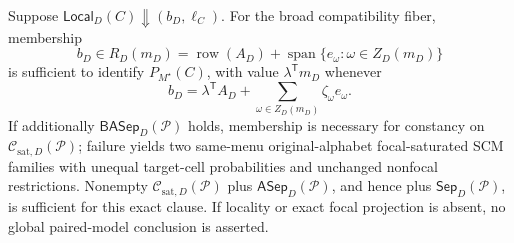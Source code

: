 Suppose \(\mathsf{Local}_D(C)\Downarrow(b_D,\ell_C)\).  For the broad compatibility fiber, membership
\[
b_D\in R_D(m_D)=\operatorname{row}(A_D)+
\operatorname{span}\{e_\omega:\omega\in Z_D(m_D)\}
\]
is sufficient to identify \(P_{M^\star}(C)\), with value \(\lambda^{\mathsf T}m_D\) whenever
\[
b_D=\lambda^{\mathsf T}A_D+
\sum_{\omega\in Z_D(m_D)}\zeta_\omega e_\omega.
\]
If additionally \(\mathsf{BASep}_D(\mathcal P)\) holds, membership is necessary for constancy on \(\mathcal C_{\mathrm{sat},D}(\mathcal P)\); failure yields two same-menu original-alphabet focal-saturated SCM families with unequal target-cell probabilities and unchanged nonfocal restrictions.  Nonempty \(\mathcal C_{\mathrm{sat},D}(\mathcal P)\) plus \(\mathsf{ASep}_D(\mathcal P)\), and hence plus \(\mathsf{Sep}_D(\mathcal P)\), is sufficient for this exact clause.  If locality or exact focal projection is absent, no global paired-model conclusion is asserted.
